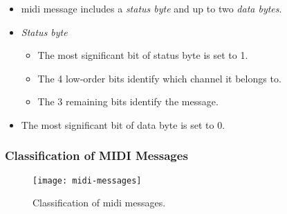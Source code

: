  \begin{itemize}
 	\item \gls{midi} message includes a \textit{status byte} and up to two \textit{data bytes}.
 	\item \textit{Status byte}
 	\begin{itemize}
 		\item The most significant bit of status byte is set to 1.
 		\item The 4 low-order bits identify which channel it belongs to.
 		\item The 3 remaining bits identify the message.
 	\end{itemize}
 	\item The most significant bit of data byte is set to 0. 
 \end{itemize}

\subsubsection*{Classification of MIDI Messages}

\begin{figure}[ht!]
	\centering
	\texttt{[image: midi-messages]}
	\caption{Classification of \gls{midi} messages.}\label{fig:midi-messages}
\end{figure}

